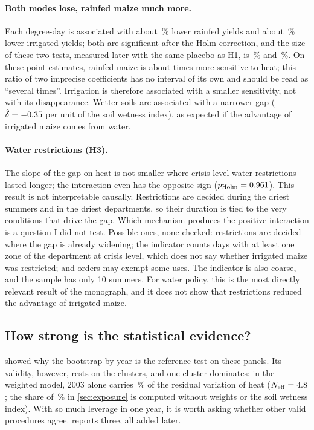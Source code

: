 \paragraph{Both modes lose, rainfed maize much more.} Each degree-day is associated with about \QoneRainfedPct\,\% lower rainfed yields and about \QoneIrrigatedPct\,\% lower irrigated yields; both are significant after the Holm correction, and the size of these two tests, measured later with the same placebo as H1, is \HtwobSize\,\% and \HtwocSize\,\%. On these point estimates, rainfed maize is about \QoneRatio{} times more sensitive to heat; this ratio of two imprecise coefficients has no interval of its own and should be read as ``several times''. Irrigation is therefore associated with a smaller sensitivity, not with its disappearance. Wetter soils are associated with a narrower gap ($\hat\delta = -0.35$ per unit of the soil wetness index), as expected if the advantage of irrigated maize comes from water.

\paragraph{Water restrictions (H3).} The slope of the gap on heat is not smaller where crisis-level water restrictions lasted longer; the interaction even has the opposite sign ($p_{\text{Holm}} = 0.961$). This result is not interpretable causally. Restrictions are decided during the driest summers and in the driest departments, so their duration is tied to the very conditions that drive the gap. Which mechanism produces the positive interaction is a question I did not test. Possible ones, none checked: restrictions are decided where the gap is already widening; the indicator counts days with at least one zone of the department at crisis level, which does not say whether irrigated maize was restricted; and orders may exempt some uses. The indicator is also coarse, and the sample has only 10 summers. For water policy, this is the most directly relevant result of the monograph, and it does not show that restrictions reduced the advantage of irrigated maize.

\subsection{How strong is the statistical evidence?}
\label{subsec:maize-inference}

 showed why the bootstrap by year is the reference test on these panels. Its validity, however, rests on the clusters, and one cluster dominates: in the weighted model, 2003 alone carries \LevThree\,\% of the residual variation of heat ($N_{\mathrm{eff}} = 4.8$; the share of \NeffMaizeShareTwoThousandThree\,\% in \cref{sec:exposure} is computed without weights or the soil wetness index). With so much leverage in one year, it is worth asking whether other valid procedures agree.  reports three, all added later.

